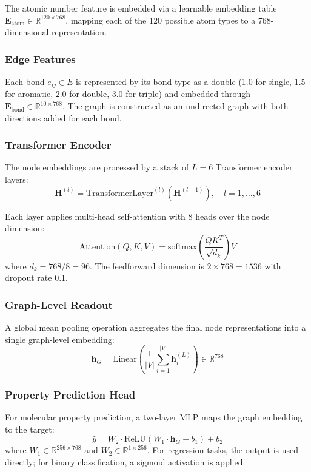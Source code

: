 \documentclass[conference]{IEEEtran}
\begin{document}
The atomic number feature is embedded via a learnable embedding table $\mathbf{E}_{\text{atom}} \in \mathbb{R}^{120 \times 768}$, mapping each of the 120 possible atom types to a 768-dimensional representation.

\subsubsection{Edge Features}
Each bond $e_{ij} \in E$ is represented by its bond type as a double (1.0 for single, 1.5 for aromatic, 2.0 for double, 3.0 for triple) and embedded through $\mathbf{E}_{\text{bond}} \in \mathbb{R}^{10 \times 768}$. The graph is constructed as an undirected graph with both directions added for each bond.

\subsubsection{Transformer Encoder}
The node embeddings are processed by a stack of $L = 6$ Transformer encoder layers:
\begin{equation}
    \mathbf{H}^{(l)} = \text{TransformerLayer}^{(l)}(\mathbf{H}^{(l-1)}), \quad l = 1, \ldots, 6
\end{equation}

Each layer applies multi-head self-attention with 8 heads over the node dimension:
\begin{equation}
    \text{Attention}(Q, K, V) = \text{softmax}\!\left(\frac{QK^T}{\sqrt{d_k}}\right)V
\end{equation}
where $d_k = 768 / 8 = 96$. The feedforward dimension is $2 \times 768 = 1536$ with dropout rate 0.1.

\subsubsection{Graph-Level Readout}
A global mean pooling operation aggregates the final node representations into a single graph-level embedding:
\begin{equation}
    \mathbf{h}_G = \text{Linear}\!\left(\frac{1}{|V|} \sum_{i=1}^{|V|} \mathbf{h}_i^{(L)}\right) \in \mathbb{R}^{768}
\end{equation}

\subsubsection{Property Prediction Head}
For molecular property prediction, a two-layer MLP maps the graph embedding to the target:
\begin{equation}
    \hat{y} = W_2 \cdot \text{ReLU}(W_1 \cdot \mathbf{h}_G + b_1) + b_2
\end{equation}
where $W_1 \in \mathbb{R}^{256 \times 768}$ and $W_2 \in \mathbb{R}^{1 \times 256}$. For regression tasks, the output is used directly; for binary classification, a sigmoid activation is applied.
\end{document}
